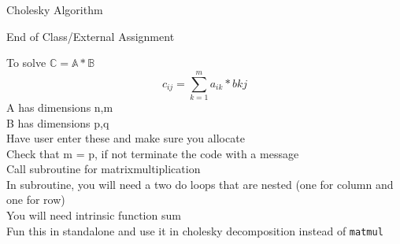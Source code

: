 \documentclass{beamer}
\begin{document}
\begin{frame}[allowframebreaks]{Cholesky Algorithm}
\begin{scriptsize}
  
\end{scriptsize}
\end{frame}
\begin{frame}{End of Class/External Assignment}

To solve $\mathbb{C} = \mathbb{A}*\mathbb{B}$
\vfill
\begin{equation}
 \nonumber
  c_{ij} = \sum_{k=1}^{m} a_{ik}*b{kj}
\end{equation}
\vfill
A has dimensions n,m \\
B has dimensions p,q \\

Have user enter these and make sure you allocate \\
Check that m = p, if not terminate the code with a message \\
Call subroutine for matrixmultiplication \\
In subroutine, you will need a two do loops that are nested (one for column and one for row) \\
You will need intrinsic function sum \\
Fun this in standalone and use it in cholesky decomposition instead of \texttt{matmul} \\

\end{frame}
\end{document}
